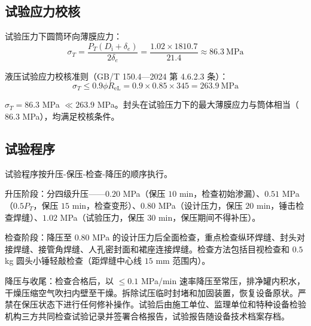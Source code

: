 \subsection{试验应力校核}

试验压力下圆筒环向薄膜应力：
\[
\sigma_T = \frac{P_T (D_{\mathrm{i}} + \delta_e)}{2\delta_e}
         = \frac{1.02 \times 1810.7}{21.4}
         \approx 86.3\ \text{MPa}
\]

液压试验应力校核准则（GB/T 150.4—2024 第 4.6.2.3 条）：
\[
\sigma_T \le 0.9 \phi R_{\text{eL}} = 0.9 \times 0.85 \times 345 = 263.9\ \text{MPa}
\]

$\sigma_T = 86.3$ MPa $ \ll 263.9$ MPa。封头在试验压力下的最大薄膜应力与筒体相当（$86.3$ MPa），均满足校核条件。

\subsection{试验程序}

试验程序按升压-保压-检查-降压的顺序执行。

升压阶段：分四级升压——$0.20$ MPa（保压 $10$ min，检查初始渗漏）、$0.51$ MPa（$0.5P_T$，保压 $15$ min，检查变形）、$0.80$ MPa（设计压力，保压 $20$ min，锤击检查焊缝）、$1.02$ MPa（试验压力，保压 $30$ min，保压期间不得补压）。

检查阶段：降压至 $0.80$ MPa 的设计压力后全面检查，重点检查纵环焊缝、封头对接焊缝、接管角焊缝、人孔密封面和裙座连接焊缝。检查方法包括目视检查和 $0.5$ kg 圆头小锤轻敲检查（距焊缝中心线 $15$ mm 范围内）。

降压与收尾：检查合格后，以 $\le 0.1$ MPa/min 速率降压至常压，排净罐内积水，干燥压缩空气吹扫内壁至干燥。拆除试压临时封堵和加固装置，恢复设备原状。严禁在保压状态下进行任何修补操作。试验后由施工单位、监理单位和特种设备检验机构三方共同检查试验记录并签署合格报告，试验报告随设备技术档案存档。
